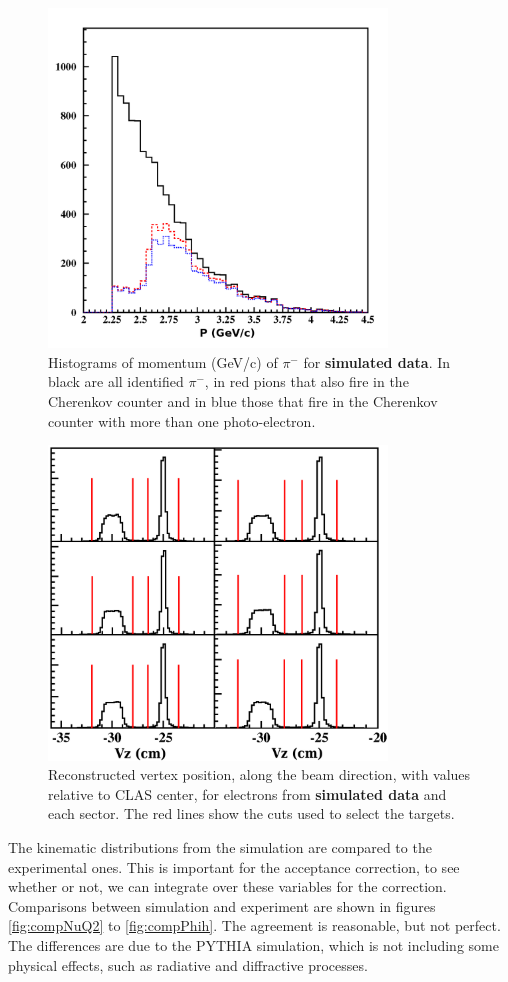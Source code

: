 \begin{figure}[tpb]
\centering
\includegraphics[width=9cm] {chap5-fig/fig06simul.png} 
\caption {Histograms of momentum (GeV/c) of $\pi^-$ for {\bf simulated data}.
In black are all identified $\pi^-$, in red pions that also fire in the 
Cherenkov counter and in blue those that fire in the Cherenkov counter with 
more than one photo-electron.}
\label{simPionCC}
\end{figure}

\begin{figure}[tpb]
\centering
\includegraphics[width=9cm] {chap5-fig/Vertex_el_sim.png}
\caption {Reconstructed vertex position, along the beam direction, with values 
relative to CLAS center, for electrons from {\bf simulated data} and each 
sector. The red lines show the cuts used to select the targets.}
\label{simvertex}
\end{figure}

The kinematic distributions from the simulation are compared to the 
experimental ones. This is important for the acceptance correction, to see 
whether or not, we can integrate over these variables for the correction.
Comparisons between simulation and experiment are shown in figures 
\ref{fig:compNuQ2} to \ref{fig:compPhih}. The agreement is reasonable, but not 
perfect. The differences are due to the PYTHIA simulation, which is not including some 
physical effects, such as radiative and diffractive processes.

